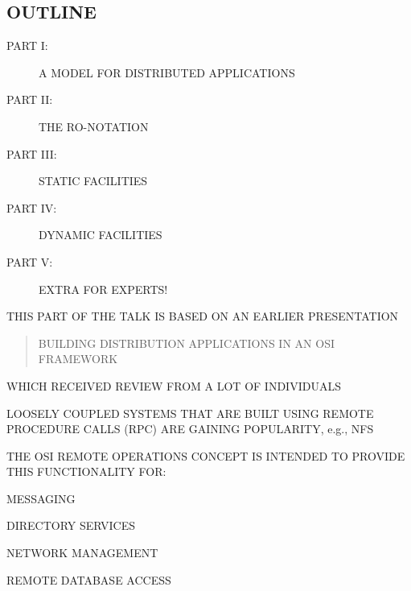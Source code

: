
\ifpractical
\else
\fi


\begin{bwslide}
\part*	{OUTLINE}\bf

\begin{description}
\item[PART I:]		A MODEL FOR DISTRIBUTED APPLICATIONS

\item[PART II:]		THE RO-NOTATION

\item[PART III:]	STATIC FACILITIES

\item[PART IV:]		DYNAMIC FACILITIES

\ifpractical
\item[PART V:]		EXTRA FOR EXPERTS!
\fi
\end{description}
\end{bwslide}


\begin{bwslide}

\begin{nrtc}
\item	THIS PART OF THE TALK IS BASED ON AN EARLIER PRESENTATION
\begin{quote}
BUILDING DISTRIBUTION APPLICATIONS IN AN OSI FRAMEWORK
\end{quote}

\item	WHICH RECEIVED REVIEW FROM A LOT OF INDIVIDUALS
\end{nrtc}
\end{bwslide}


\begin{bwslide}

\begin{nrtc}
\item	LOOSELY COUPLED SYSTEMS THAT ARE BUILT USING REMOTE PROCEDURE CALLS
	(RPC) ARE GAINING POPULARITY, e.g., NFS

\item	THE OSI REMOTE OPERATIONS CONCEPT IS INTENDED TO PROVIDE THIS
	FUNCTIONALITY FOR:
    \begin{nrtc}
    \item	MESSAGING

    \item	DIRECTORY SERVICES

    \item	NETWORK MANAGEMENT

    \item	REMOTE DATABASE ACCESS
    \end{nrtc}
\end{nrtc}
\end{bwslide}


